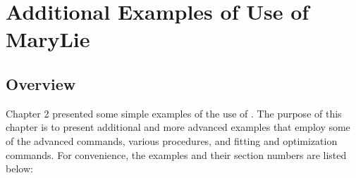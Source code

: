 
\chapter{Additional Examples of Use of MaryLie}

\section{Overview}

Chapter 2 presented some simple examples of the use of \Maryend.  The
purpose of this chapter is to present additional and more advanced
examples that employ some of the advanced commands, various procedures,
and fitting and optimization commands.  For convenience, the examples and
their section numbers are listed below:

